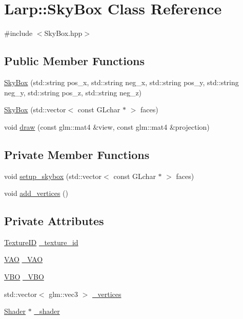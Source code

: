 \hypertarget{classLarp_1_1SkyBox}{}\section{Larp\+:\+:Sky\+Box Class Reference}
\label{classLarp_1_1SkyBox}


{\ttfamily \#include $<$Sky\+Box.\+hpp$>$}

\subsection*{Public Member Functions}
\begin{DoxyCompactItemize}
\item 
\hyperlink{classLarp_1_1SkyBox_a61ce9716a72990425379dffe8a905031}{Sky\+Box} (std\+::string pos\+\_\+x, std\+::string neg\+\_\+x, std\+::string pos\+\_\+y, std\+::string neg\+\_\+y, std\+::string pos\+\_\+z, std\+::string neg\+\_\+z)
\item 
\hyperlink{classLarp_1_1SkyBox_a9e8363e97b142013cad3cca5e4b830da}{Sky\+Box} (std\+::vector$<$ const G\+Lchar $\ast$ $>$ faces)
\item 
void \hyperlink{classLarp_1_1SkyBox_a6afa95d42fb5796a0583753ab0c4ea50}{draw} (const glm\+::mat4 \&view, const glm\+::mat4 \&projection)
\end{DoxyCompactItemize}
\subsection*{Private Member Functions}
\begin{DoxyCompactItemize}
\item 
void \hyperlink{classLarp_1_1SkyBox_a5fd9c148aabb7a66bbb9e93ec424da0c}{setup\+\_\+skybox} (std\+::vector$<$ const G\+Lchar $\ast$ $>$ faces)
\item 
void \hyperlink{classLarp_1_1SkyBox_a2760c45ebde25cf706ee84ba5bd867bd}{add\+\_\+vertices} ()
\end{DoxyCompactItemize}
\subsection*{Private Attributes}
\begin{DoxyCompactItemize}
\item 
\hyperlink{namespaceLarp_a74839f089efb43154cba04bae031c942}{Texture\+ID} \hyperlink{classLarp_1_1SkyBox_a9e087238b347e4f12fec0798559b3aed}{\+\_\+texture\+\_\+id}
\item 
\hyperlink{namespaceLarp_a459edfbf6a0def594cfeb6ecaa5d702e}{V\+AO} \hyperlink{classLarp_1_1SkyBox_aece3fc2f885d9b9f429f5829378f5720}{\+\_\+\+V\+AO}
\item 
\hyperlink{namespaceLarp_ac6c5fe9357b92190f95c04109eb8c4f1}{V\+BO} \hyperlink{classLarp_1_1SkyBox_ac9a81bf07d8722a4707479883ec0394a}{\+\_\+\+V\+BO}
\item 
std\+::vector$<$ glm\+::vec3 $>$ \hyperlink{classLarp_1_1SkyBox_ab4174c418ecd405b91f6c3ee70edf1f7}{\+\_\+vertices}
\item 
\hyperlink{classLarp_1_1Shader}{Shader} $\ast$ \hyperlink{classLarp_1_1SkyBox_a6ade008779816dcf2bacacf0d5c228a1}{\+\_\+shader}
\end{DoxyCompactItemize}


